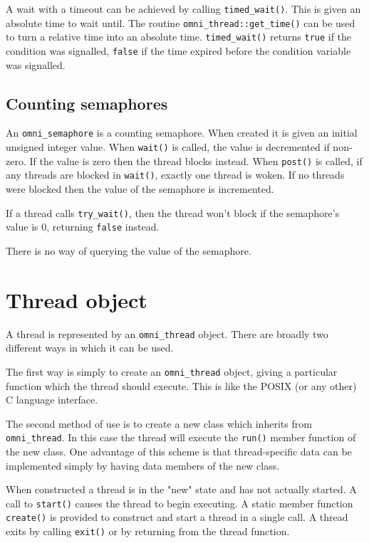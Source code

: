 \documentclass[11pt,twoside,a4paper]{article}
\newcommand{\dsc}{\discretionary{}{}}
\begin{document}
A wait with a timeout can be achieved by calling
\texttt{timed\_wait()}.  This is given an absolute time to wait until.
The routine \texttt{omni\_thread::get\_time()} can be used to turn a
relative time into an absolute time.  \texttt{timed\_wait()} returns
\texttt{true} if the condition was signalled, \texttt{false} if the
time expired before the condition variable was signalled.


\subsection{Counting semaphores}

An \texttt{omni\_semaphore} is a counting semaphore.  When created it
is given an initial unsigned integer value.  When \texttt{wait()} is
called, the value is decremented if non-zero.  If the value is zero
then the thread blocks instead.  When \texttt{post()} is called, if
any threads are blocked in \texttt{wait()}, exactly one thread is
woken. If no threads were blocked then the value of the semaphore is
incremented.

If a thread calls \texttt{try\_wait()}, then the thread won't block if
the semaphore's value is 0, returning \texttt{false} instead.

There is no way of querying the value of the semaphore.



\section{Thread object}

A thread is represented by an \texttt{omni\_thread} object.  There are
broadly two different ways in which it can be used.

The first way is simply to create an \texttt{omni\_thread} object,
giving a particular function which the thread should execute.  This is
like the POSIX (or any other) C language interface.

The second method of use is to create a new class which inherits from
\texttt{omni\_\dsc{}thread}.  In this case the thread will execute the
\texttt{run()} member function of the new class.  One advantage of
this scheme is that thread-specific data can be implemented simply by
having data members of the new class.

When constructed a thread is in the "new" state and has not actually
started.  A call to \texttt{start()} causes the thread to begin
executing.  A static member function \texttt{create()} is provided to
construct and start a thread in a single call.  A thread exits by
calling \texttt{exit()} or by returning from the thread function.
\end{document}

